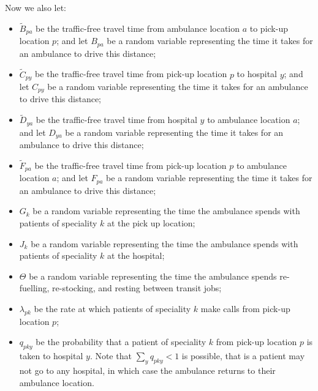 \documentclass[preprint,12pt]{elsarticle}
\begin{document}
Now we also let: \begin{itemize} \item $\tilde{B}_{pa}$ be the traffic-free
            travel time from ambulance location $a$ to pick-up location $p$; and
            let $B_{pa}$ be a random variable representing the time it takes for
            an ambulance to drive this distance; \item $\tilde{C}_{py}$ be the
                traffic-free travel time from pick-up location $p$ to hospital
                $y$; and let $C_{py}$ be a random variable representing the time
                it takes for an ambulance to drive this distance; \item
                    $\tilde{D}_{ya}$ be the traffic-free travel time from
                    hospital $y$ to ambulance location $a$; and let $D_{ya}$ be
                    a random variable representing the time it takes for an
                    ambulance to drive this distance; \item $\tilde{F}_{pa}$ be
                        the traffic-free travel time from pick-up location $p$
                        to ambulance location $a$; and let $F_{pa}$ be a random
                        variable representing the time it takes for an ambulance
                        to drive this distance; \item $G_k$ be a random variable
                        representing the time the ambulance spends with patients
                    of speciality $k$ at the pick up location; \item $J_k$ be a
                        random variable representing the time the ambulance
                        spends with patients of speciality $k$ at the hospital;
                    \item $\Theta$ be a random variable representing the time
                    the ambulance spends re-fuelling, re-stocking, and resting
                between transit jobs; \item $\lambda_{pk}$ be the rate at which
                    patients of speciality $k$ make calls from pick-up location
                $p$; \item $q_{pky}$ be the probability that a patient of
                    speciality $k$ from pick-up location $p$ is taken to
                    hospital $y$.  Note that $\sum_y q_{pky} < 1$ is possible,
                    that is a patient may not go to any hospital, in which case
the ambulance returns to their ambulance location.  \end{itemize}
\end{document}
